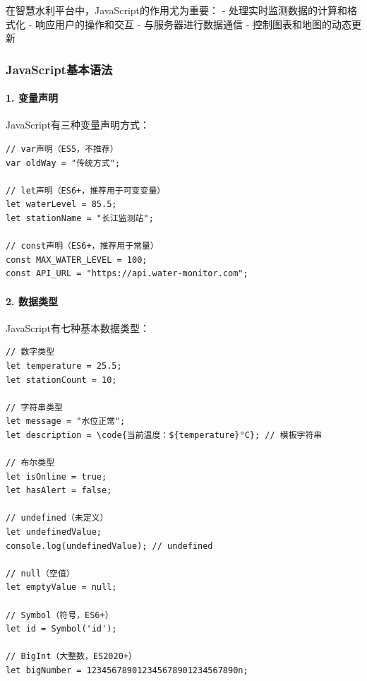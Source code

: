 在智慧水利平台中，JavaScript的作用尤为重要： - 处理实时监测数据的计算和格式化 - 响应用户的操作和交互 - 与服务器进行数据通信 - 控制图表和地图的动态更新

\hypertarget{javascriptux57faux672cux8bedux6cd5}{%
\subsubsection{JavaScript基本语法}\label{javascriptux57faux672cux8bedux6cd5}}

\hypertarget{ux53d8ux91cfux58f0ux660e}{%
\paragraph{1. 变量声明}\label{ux53d8ux91cfux58f0ux660e}}

JavaScript有三种变量声明方式：

\begin{lstlisting}[style=javascript]
// var声明（ES5，不推荐）
var oldWay = "传统方式";

// let声明（ES6+，推荐用于可变变量）
let waterLevel = 85.5;
let stationName = "长江监测站";

// const声明（ES6+，推荐用于常量）
const MAX_WATER_LEVEL = 100;
const API_URL = "https://api.water-monitor.com";
\end{lstlisting}

\hypertarget{ux6570ux636eux7c7bux578b}{%
\paragraph{2. 数据类型}\label{ux6570ux636eux7c7bux578b}}

JavaScript有七种基本数据类型：

\begin{lstlisting}[style=javascript]
// 数字类型
let temperature = 25.5;
let stationCount = 10;

// 字符串类型
let message = "水位正常";
let description = \code{当前温度：${temperature}°C}; // 模板字符串

// 布尔类型
let isOnline = true;
let hasAlert = false;

// undefined（未定义）
let undefinedValue;
console.log(undefinedValue); // undefined

// null（空值）
let emptyValue = null;

// Symbol（符号，ES6+）
let id = Symbol('id');

// BigInt（大整数，ES2020+）
let bigNumber = 123456789012345678901234567890n;
\end{lstlisting}


